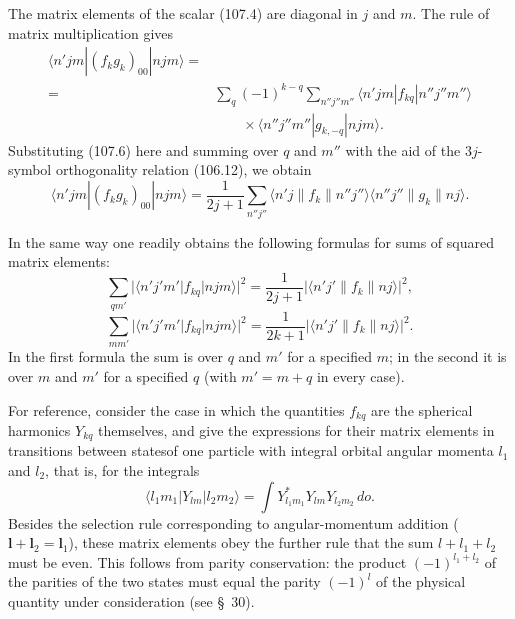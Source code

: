 The matrix elements of the scalar (107.4) are diagonal in $j$ and $m$. The rule of matrix multiplication gives
\[
 \begin{aligned}
 \langle n'jm|(f_kg_k)_{00}|njm\rangle={}&\\
 ={}&\sum_q(-1)^{k-q}\sum_{n''j''m''}
 \langle n'jm|f_{kq}|n''j''m''\rangle\\
 &\qquad{}\times\langle n''j''m''|g_{k,-q}|njm\rangle.
 \end{aligned}
\]
Substituting (107.6) here and summing over $q$ and $m''$ with the aid of the $3j$-symbol orthogonality relation (106.12), we obtain
\begin{equation}
 \langle n'jm|(f_kg_k)_{00}|njm\rangle=
 \frac1{2j+1}\sum_{n''j''}\langle n'j\|f_k\|n''j''\rangle
 \langle n''j''\|g_k\|nj\rangle.
 \tag{107.10}
\end{equation}

In the same way one readily obtains the following formulas for sums of squared matrix elements:
\begin{equation}
 \sum_{qm'}|\langle n'j'm'|f_{kq}|njm\rangle|^2=
 \frac1{2j+1}|\langle n'j'\|f_k\|nj\rangle|^2,
 \tag{107.11}
\end{equation}
\begin{equation}
 \sum_{mm'}|\langle n'j'm'|f_{kq}|njm\rangle|^2=
 \frac1{2k+1}|\langle n'j'\|f_k\|nj\rangle|^2.
 \tag{107.12}
\end{equation}
In the first formula the sum is over $q$ and $m'$ for a specified $m$; in the second it is over $m$ and $m'$ for a specified $q$ (with $m'=m+q$ in every case).

For reference, consider the case in which the quantities $f_{kq}$ are the spherical harmonics $Y_{kq}$ themselves, and give the expressions for their matrix elements in transitions between statesof one particle with integral orbital angular momenta $l_1$ and $l_2$, that is, for the integrals
\begin{equation}
 \langle l_1m_1|Y_{lm}|l_2m_2\rangle=\int Y_{l_1m_1}^{*}Y_{lm}Y_{l_2m_2}\,do.
 \tag{107.13}
\end{equation}
Besides the selection rule corresponding to angular-momentum addition ($\mathbf l+\mathbf l_2=\mathbf l_1$), these matrix elements obey the further rule that the sum $l+l_1+l_2$ must be even. This follows from parity conservation: the product $(-1)^{l_1+l_2}$ of the parities of the two states must equal the parity $(-1)^l$ of the physical quantity under consideration (see \S~30).

